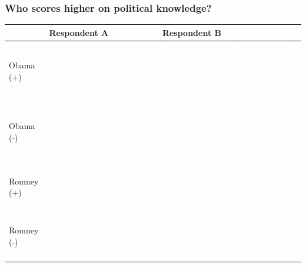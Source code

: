 \documentclass{beamer}
\begin{document}
\begin{frame}%
\frametitle{Who scores higher on political knowledge?}
\begin{table}[ht]\footnotesize\centering
\begin{tabular}{l|p{4.5cm}|p{4.5cm}}
   \toprule
    & \textbf{Respondent A} & \textbf{Respondent B} \\ 
    \midrule
  Obama (+) & \textcolor{white}{I think he is honest, has good intentions.} & \textcolor{white}{He's got a hot wife. Sound mind. Bill Clinton, the best president we ever had, is voting for him. He's not in any type of scandal and is the perfect president for us now.} \\ \hdashline
  Obama (-) & \textcolor{white}{I don't feel he is up for the job, he doesn't really know how to get things accomplished from idea to actual reality.} &  \\ \hdashline
  Romney (+) & \textcolor{white}{He comes across as an honest person and I feel that financially he would be better for the country.} &  \\ \hdashline
  Romney (-) & \textcolor{white}{I am a moderate conservative and there are some things about anti-gay rights that I don't support.} & \textcolor{white}{Everything.} \\
    \bottomrule
 \end{tabular}
\end{table}
\end{frame}
\end{document}
